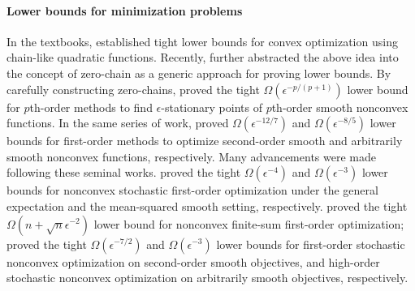 \documentclass{article}
\begin{document}
\paragraph{Lower bounds for minimization problems} In the textbooks, \citet{nemirovskij1983problem,nesterov2018lectures} established tight lower bounds for convex optimization using chain-like quadratic functions. Recently, \citet{carmon2020lower,carmon2021lower} further abstracted the above idea into the concept of zero-chain as a generic approach for proving lower bounds. By carefully constructing zero-chains, \citet{carmon2020lower} proved the tight $\Omega(\epsilon^{-p/(p+1)})$  lower bound for 
$p$th-order methods to find $\epsilon$-stationary points of $p$th-order smooth nonconvex functions. In the same series of work, \citet{carmon2021lower}
proved $\Omega(\epsilon^{-12/7})$ and  $\Omega(\epsilon^{-8/5})$  lower bounds for 
first-order methods to optimize second-order smooth and arbitrarily smooth nonconvex functions, respectively.  
Many advancements were made following these seminal works. \citet{arjevani2023lower} proved the tight $\Omega(\epsilon^{-4})$ and $\Omega(\epsilon^{-3})$ lower bounds for nonconvex stochastic first-order optimization under the general expectation and the mean-squared smooth setting, respectively. 
\citet{fang2018spider,li2021page} proved the tight $\Omega(n + \sqrt{n} \epsilon^{-2})$ lower bound for nonconvex finite-sum first-order optimization; \citet{arjevani2020second} proved 
the tight $\Omega(\epsilon^{-7/2})$ and $\Omega(\epsilon^{-3})$ lower bounds for first-order stochastic nonconvex optimization on second-order smooth objectives, and
high-order stochastic nonconvex optimization on arbitrarily smooth objectives, respectively.
\end{document}

